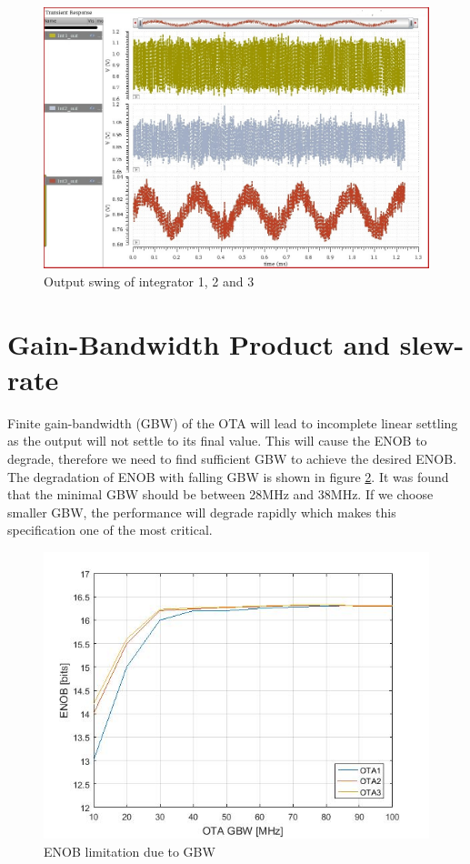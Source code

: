 \begin{figure}[h]
\centering
\includegraphics[scale=0.45]{images/output_swing.jpg}
\caption{Output swing of integrator 1, 2 and 3}
\label{fig:output_swing}
\end{figure}

\section{Gain-Bandwidth Product and slew-rate}

Finite gain-bandwidth (GBW) of the OTA will lead to incomplete linear settling as the output will not settle to its final value. This will cause the ENOB to degrade, therefore we need to find sufficient GBW to achieve the desired ENOB. The degradation of ENOB with falling GBW is shown in figure \ref{fig:GBW_spec}. It was found that the minimal GBW should be between 28MHz and 38MHz. If we choose smaller GBW, the performance will degrade rapidly which makes this specification one of the most critical.

\begin{figure}[h]
\centering
\includegraphics[scale=0.55]{images/GBW_spec.jpg}
\caption{ENOB limitation due to GBW}
\label{fig:GBW_spec}
\end{figure}

